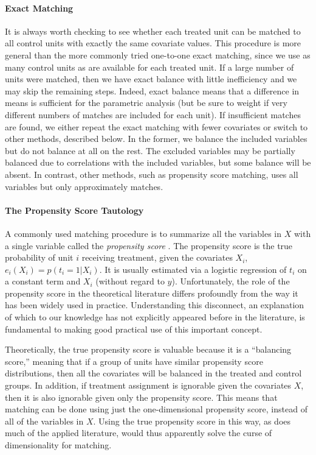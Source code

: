 \documentclass[11pt,titlepage]{article}
\begin{document}
\paragraph{Exact Matching}  
It is always worth checking to see whether each treated unit can be
matched to all control units with exactly the same covariate values.
This procedure is more general than the more commonly tried one-to-one
exact matching, since we use as many control units as are available
for each treated unit.  If a large number of units were matched, then
we have exact balance with little inefficiency and we may skip the
remaining steps.  Indeed, exact balance means that a difference in
means is sufficient for the parametric analysis (but be sure to weight
if very different numbers of matches are included for each unit).  If
insufficient matches are found, we either repeat the exact matching
with fewer covariates or switch to other methods, described below.  In
the former, we balance the included variables but do not balance at
all on the rest.  The excluded variables may be partially balanced due
to correlations with the included variables, but some balance will be
absent.  In contrast, other methods, such as propensity score
matching, uses all variables but only approximately matches.

\paragraph{The Propensity Score Tautology}
A commonly used matching procedure is to summarize all the variables
in $X$ with a single variable called the \emph{propensity score}
\citep{RosRub83}.  The propensity score is the true probability of
unit $i$ receiving treatment, given the covariates $X_i$, $e_i(X_i) =
p(t_i=1 | X_i)$.  It is usually estimated via a logistic regression of
$t_i$ on a constant term and $X_i$ (without regard to $y$).
Unfortunately, the role of the propensity score in the theoretical
literature differs profoundly from the way it has been widely used in
practice.  Understanding this disconnect, an explanation of which to
our knowledge has not explicitly appeared before in the literature, is
fundamental to making good practical use of this important concept.

Theoretically, the true propensity score is valuable because it is a
``balancing score,'' meaning that if a group of units have similar
propensity score distributions, then all the covariates will be
balanced in the treated and control groups.  In addition, if treatment
assignment is ignorable given the covariates $X$, then it is also
ignorable given only the propensity score.  This means that matching
can be done using just the one-dimensional propensity score, instead
of all of the variables in $X$.  Using the true propensity score in
this way, as does much of the applied literature, would thus
apparently solve the curse of dimensionality for matching.
\end{document}
